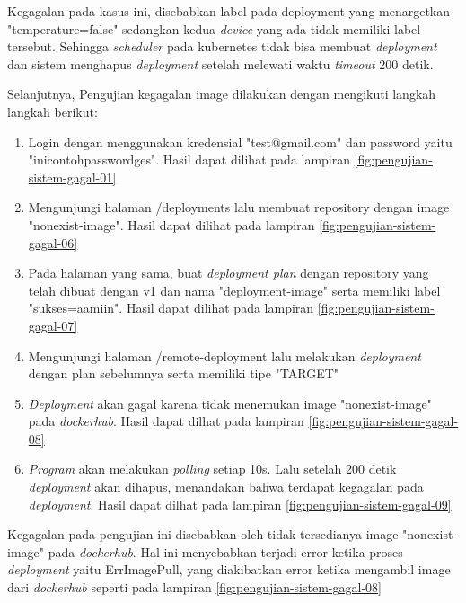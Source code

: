 Kegagalan pada kasus ini, disebabkan label pada deployment yang menargetkan "temperature=false" sedangkan kedua \textit{device} yang ada tidak memiliki label tersebut. Sehingga \textit{scheduler} pada kubernetes tidak bisa membuat \textit{deployment} dan sistem menghapus \textit{deployment} setelah melewati waktu \textit{timeout} 200 detik.

Selanjutnya, Pengujian kegagalan image dilakukan dengan mengikuti langkah langkah berikut:

\begin{enumerate}
  \item Login dengan menggunakan kredensial "test@gmail.com" dan password yaitu "inicontohpasswordges". Hasil dapat dilihat pada lampiran \ref{fig:pengujian-sistem-gagal-01}
  \item Mengunjungi halaman /deployments lalu membuat repository dengan image "nonexist-image". Hasil dapat dilihat pada lampiran \ref{fig:pengujian-sistem-gagal-06}
  \item Pada halaman yang sama, buat \textit{deployment plan} dengan repository yang telah dibuat dengan v1 dan nama "deployment-image" serta memiliki label "sukses=aamiin". Hasil dapat dilihat pada lampiran \ref{fig:pengujian-sistem-gagal-07}
  \item Mengunjungi halaman /remote-deployment lalu melakukan \textit{deployment} dengan plan sebelumnya serta memiliki tipe "TARGET"
  \item \textit{Deployment} akan gagal karena tidak menemukan image "nonexist-image" pada \textit{dockerhub}. Hasil dapat dilhat pada lampiran \ref{fig:pengujian-sistem-gagal-08}
  \item \textit{Program} akan melakukan \textit{polling} setiap 10s. Lalu setelah 200 detik \textit{deployment} akan dihapus, menandakan bahwa terdapat kegagalan pada \textit{deployment}. Hasil dapat dilhat pada lampiran \ref{fig:pengujian-sistem-gagal-09}
\end{enumerate}

Kegagalan pada pengujian ini disebabkan oleh tidak tersedianya image "nonexist-image" pada \textit{dockerhub}. Hal ini menyebabkan terjadi error ketika proses \textit{deployment} yaitu ErrImagePull, yang diakibatkan error ketika mengambil image dari \textit{dockerhub} seperti pada lampiran \ref{fig:pengujian-sistem-gagal-08}